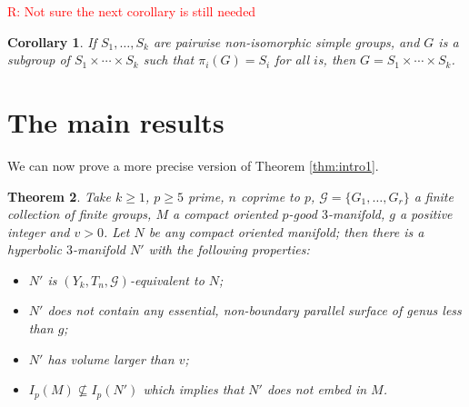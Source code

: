 \documentclass[12pt]{amsart}
\newtheorem{thm}{Theorem}[section]
\newtheorem{cor}[thm]{Corollary}
\theoremstyle{definition}
\begin{document}
\textcolor{red}{R: Not sure the next corollary is still needed}
\begin{cor}
	If $S_1,\dots,S_k$ are pairwise non-isomorphic simple groups, and $G$ is a subgroup of $S_1\times\cdots\times S_k$ such that $\pi_i(G)=S_i$ for all $i$s, then $G=S_1\times\cdots\times S_k$.
\end{cor}\fi


\section{The main results}\label{sec:proofs}

We can now prove a more precise version of Theorem \ref{thm:intro1}.
\begin{thm}\label{thm:main}
	Take $k\geq 1$, $p\geq 5$ prime, $n$ coprime to $p$, $\mathcal{G}=\{G_1,\dots, G_r\}$ a finite collection of finite groups, $M$ a compact oriented $p$-good $3$-manifold, $g$ a positive integer and $v>0$. Let $N$ be any compact oriented manifold; then there is a hyperbolic $3$-manifold $N'$ with the following properties:
	
	\begin{itemize}
		\item  $N'$ is $(Y_k,T_n,\mathcal{G})$-equivalent to $N$;
		\item $N'$ does not contain any essential, non-boundary parallel surface of genus less than $g$;
		\item $N'$ has volume larger than $v$;
		\item $I_p(M)\nsubseteq I_p(N')$ which implies that $N'$ does not embed in $M$.
	\end{itemize}
\end{thm}
\end{document}
